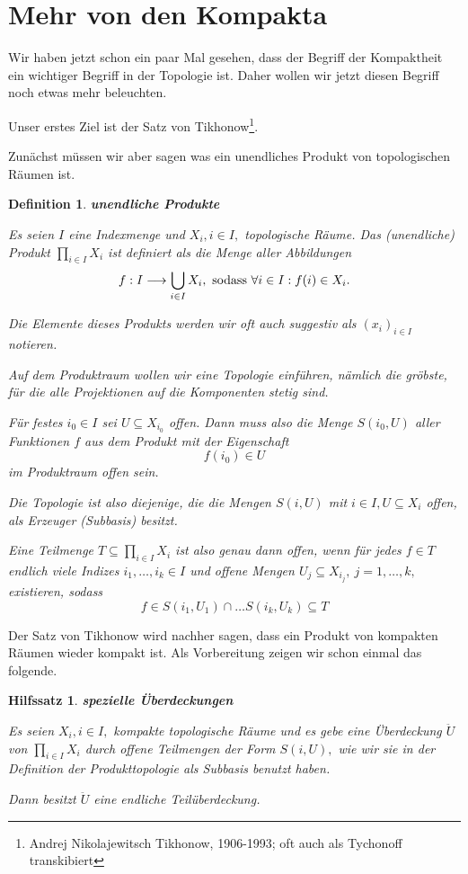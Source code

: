 \documentclass[12pt]{scrbook}   %
\newtheorem{hilfsX}[alles]{Hilfssatz}
\newenvironment{hilfs}[1]{\begin{hilfsX}{\bf #1}\par}{\end{hilfsX}}
\newtheorem{definiX}[alles]{Definition}
\newenvironment{defini}[1]{\begin{definiX}{\bf #1}\par\rm}{\end{definiX}}
\begin{document}
\section{Mehr von den Kompakta}

Wir haben jetzt schon ein paar Mal gesehen, dass der Begriff der Kompaktheit
ein wichtiger Begriff in der Topologie ist. Daher wollen wir jetzt diesen 
Begriff noch etwas mehr beleuchten.

Unser erstes Ziel ist der Satz von Tikhonow\footnote{Andrej Nikolajewitsch 
Tikhonow, 1906-1993; oft auch als Tychonoff transkibiert}.

Zun\"achst m\"ussen wir aber sagen was ein unendliches Produkt von 
topologischen R\"aumen ist.

\begin{defini}{unendliche Produkte}
Es seien $I$ eine Indexmenge und $X_i,i\in I,$ topologische R\"aume. Das
{\it (unendliche) Produkt} $\prod_{i\in I}X_i$ ist definiert als die Menge aller
Abbildungen 
$$f: I\longrightarrow \bigcup_{i\in I}X_i,\ {\rm sodass}\ \forall i\in I: 
f(i)\in X_i.$$

Die Elemente dieses Produkts werden wir oft auch suggestiv als $(x_i)_{i\in I}$
notieren.

Auf dem Produktraum wollen wir eine Topologie einf\"uhren, n\"amlich die 
gr\"obste, f\"ur die alle Projektionen auf die Komponenten stetig sind. 

F\"ur festes $i_0\in I$ sei $U\subseteq X_{i_0}$ offen. Dann muss also die Menge
$S(i_0,U)$ aller Funktionen $f$ aus dem Produkt mit der Eigenschaft
$$f(i_0)\in U$$
im Produktraum offen sein.

Die Topologie ist also diejenige, die die Mengen $S(i,U)$ mit $i\in I, 
U\subseteq X_i$ offen, als Erzeuger (Subbasis) besitzt.

Eine Teilmenge $T\subseteq \prod_{i\in I}X_i$ ist also genau dann offen, wenn 
f\"ur jedes $f\in T$ endlich viele Indizes $i_1,\dots ,i_k\in I$ und offene 
Mengen $U_{j}\subseteq X_{i_j},\ j =1,\dots ,k,$ existieren, sodass
$$f\in S(i_1,U_1)\cap \dots S(i_k,U_k)\subseteq T$$

\end{defini}

Der Satz von Tikhonow wird nachher sagen, dass ein Produkt von kompakten 
R\"aumen wieder kompakt ist. Als Vorbereitung zeigen wir schon einmal das
folgende.

\begin{hilfs}{spezielle \"Uberdeckungen}\label{Spezialfall} 
Es seien $X_i, i\in I,$ kompakte topologische R\"aume und es gebe eine 
\"Uberdeckung $\ddot U$ von $\prod_{i\in I} X_i$ durch offene Teilmengen der Form
$S(i,U),$ wie wir sie in der Definition der Produkttopologie als Subbasis 
benutzt haben.

Dann besitzt $\ddot U$ eine endliche Teil\"uberdeckung.
\end{hilfs}
\end{document}
